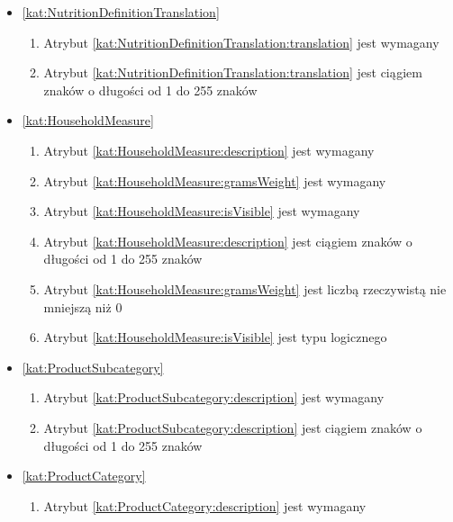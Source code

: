 \begin{itemize}[label={\textbf{Ograniczenia dla}}, wide, labelwidth=!, labelindent=0pt]
    \item\ref{kat:NutritionDefinitionTranslation}
    \begin{enumerate}[label={\textbf{OGR/\protect\threedigits{\arabic{enumi}}}}, wide, labelwidth=!, align=left, leftmargin=3cm, resume]
        \item Atrybut \ref{kat:NutritionDefinitionTranslation:translation} jest wymagany

        \item Atrybut \ref{kat:NutritionDefinitionTranslation:translation} jest ciągiem znaków o długości od 1 do 255 znaków
    \end{enumerate}

    \item\ref{kat:HouseholdMeasure}
    \begin{enumerate}[label={\textbf{OGR/\protect\threedigits{\arabic{enumi}}}}, wide, labelwidth=!, align=left, leftmargin=3cm, resume]
        \item Atrybut \ref{kat:HouseholdMeasure:description} jest wymagany
        \item Atrybut \ref{kat:HouseholdMeasure:gramsWeight} jest wymagany
        \item Atrybut \ref{kat:HouseholdMeasure:isVisible} jest wymagany

        \item Atrybut \ref{kat:HouseholdMeasure:description} jest ciągiem znaków o długości od 1 do 255 znaków
        \item Atrybut \ref{kat:HouseholdMeasure:gramsWeight} jest liczbą rzeczywistą nie mniejszą niż 0
        \item Atrybut \ref{kat:HouseholdMeasure:isVisible} jest typu logicznego
    \end{enumerate}

    \item\ref{kat:ProductSubcategory}
    \begin{enumerate}[label={\textbf{OGR/\protect\threedigits{\arabic{enumi}}}}, wide, labelwidth=!, align=left, leftmargin=3cm, resume]
        \item Atrybut \ref{kat:ProductSubcategory:description} jest wymagany

        \item Atrybut \ref{kat:ProductSubcategory:description} jest ciągiem znaków o długości od 1 do 255 znaków
    \end{enumerate}

    \item\ref{kat:ProductCategory}
    \begin{enumerate}[label={\textbf{OGR/\protect\threedigits{\arabic{enumi}}}}, wide, labelwidth=!, align=left, leftmargin=3cm, resume]
        \item Atrybut \ref{kat:ProductCategory:description} jest wymagany


\end{enumerate}
\end{itemize}
